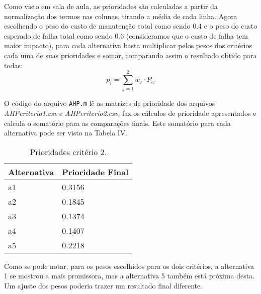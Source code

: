 Como visto em sala de aula, as prioridades são calculadas a partir da normalização dos termos nas colunas, tirando a média de cada linha. Agora escolhendo o peso do custo de manutenção total como sendo 0.4 e o peso do custo esperado de falha total como sendo 0.6 (consideramos que o custo de falha tem maior impacto), para cada alternativa basta multiplicar pelos pesos dos critérios cada uma de suas prioridades e somar, comparando assim o resultado obtido para todas:
\begin{equation}
p_i = \sum_{j=1}^{2} w_j \cdot P_{ij}
\end{equation}

O código do arquivo \texttt{AHP.m} lê as matrizes de prioridade dos arquivos \textit{AHPcriterio1.csv} e \textit{AHPcriterio2.csv}, faz os cálculos de prioridade apresentados e calcula o somatório para as comparações finais. Este somatório para cada alternativa pode ser visto na Tabela IV.
\begin{table}[h]
	\centering
	\begin{tabular}{ | l | l | }
		\hline
		Alternativa & Prioridade Final \\ \hline
		a1 & 0.3156 \\ \hline
		a2 & 0.1845 \\ \hline
		a3 & 0.1374 \\ \hline
		a4 & 0.1407 \\ \hline
		a5 & 0.2218 \\ \hline
	\end{tabular}
	\label{table:ahp-result}
	\caption{Prioridades critério 2.}
\end{table}

Como se pode notar, para os pesos escolhidos para os dois critérios, a alternativa 1 se mostrou a mais promissora, mas a alternativa 5 também está próxima desta. Um ajuste dos pesos poderia trazer um resultado final diferente.